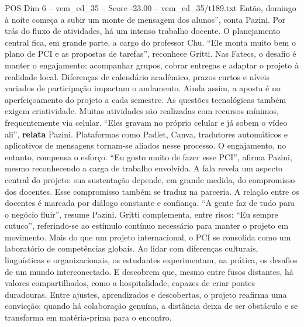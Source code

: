 \begin{textsample}{POS Dim 6 – vem\_ed\_35 – Score -23.00 – vem\_ed\_35/t189.txt}
Então, domingo à noite começa a subir um monte de mensagem dos alunos”, conta Pazini.
Por trás do fluxo de atividades, há um intenso trabalho docente.
O planejamento central fica, em grande parte, a cargo do professor Chu. “Ele monta muito bem o plano de PCI e as propostas de tarefas”, reconhece Gritti.
Nas Fatecs, o desafio é manter o engajamento: acompanhar grupos, cobrar entregas e adaptar o projeto à realidade local.
Diferenças de calendário acadêmico, prazos curtos e níveis variados de participação impactam o andamento.
Ainda assim, a aposta é no aperfeiçoamento do projeto a cada semestre.
As questões tecnológicas também exigem criatividade.
Muitas atividades são realizadas com recursos mínimos, frequentemente via celular. “Eles gravam no próprio celular e já sobem o vídeo ali”, \textbf{relata} Pazini.
Plataformas como Padlet, Canva, tradutores automáticos e aplicativos de mensagens tornam-se aliados nesse processo.
O engajamento, no entanto, compensa o esforço. “Eu gosto muito de fazer esse PCI”, afirma Pazini, mesmo reconhecendo a carga de trabalho envolvida.
A fala revela um aspecto central do projeto: sua sustentação depende, em grande medida, do compromisso dos docentes.
Esse compromisso também se traduz na parceria.
A relação entre os docentes é marcada por diálogo constante e confiança. “A gente faz de tudo para o negócio fluir”, resume Pazini.
Gritti complementa, entre risos: “Eu sempre cutuco”, referindo-se ao estímulo contínuo necessário para manter o projeto em movimento.
Mais do que um projeto internacional, o PCI se consolida como um laboratório de competências globais.
Ao lidar com diferenças culturais, linguísticas e organizacionais, os estudantes experimentam, na prática, os desafios de um mundo interconectado.
E descobrem que, mesmo entre fusos distantes, há valores compartilhados, como a hospitalidade, capazes de criar pontes duradouras.
Entre ajustes, aprendizados e descobertas, o projeto reafirma uma convicção: quando há colaboração genuína, a distância deixa de ser obstáculo e se transforma em matéria-prima para o encontro.

\end{textsample}
